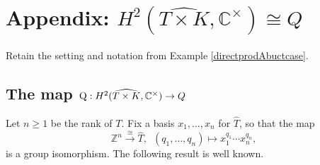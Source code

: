 \documentclass{amsart}
\theoremstyle{definition}
\numberwithin{equation}{section}
\begin{document}
\section{Appendix: $H^2(\widehat{T\times K},\mathbb{C}^{\times})\cong Q$}\label{sec:appendix}
Retain the setting and notation from Example \ref{directprodAbuctcase}.

\subsection{The map ${\rm Q}:H^2(\widehat{T\times K},\mathbb{C}^{\times})\to Q$} 
Let $n\ge 1$ be the rank of $T$. Fix a basis $x_1,\dots,x_n$ for $\widehat{T}$, so that the map
$$\mathbb{Z}^n\xrightarrow{\cong}\widehat{T},\,\,\,(q_1,\dots, q_n)\mapsto x_1^{q_1}\cdots x_n^{q_n},$$
is a group isomorphism. The following result is well known.
\end{document}
